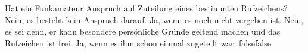     {Hat ein Funkamateur Anspruch auf Zuteilung eines bestimmten Rufzeichens?}
    {Nein, es besteht kein Anspruch darauf.}
    {Ja, wenn es noch nicht vergeben ist.}
    {Nein, es sei denn, er kann besondere persönliche Gründe geltend machen und das Rufzeichen ist frei.}
    {Ja, wenn es ihm schon einmal zugeteilt war.}
    {false}{false}